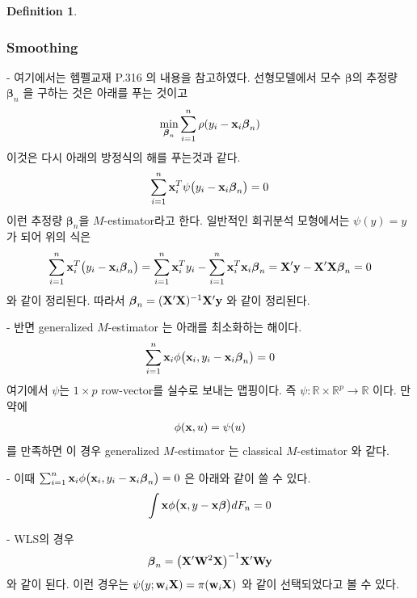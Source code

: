 \documentclass[preprint, review, 12pt]{article}
\theoremstyle{definition}
\newtheorem{dfn}{Definition}
\theoremstyle{remark}
\begin{document}
\begin{dfn}
\subsubsection*{Smoothing}

- 여기에서는 헴펠교재 P.316 의 내용을 참고하였다. 선형모델에서 모수 $\boldsymbol{\beta}$의 추정량 $\boldsymbol{\beta}_ n$ 을 구하는 것은 아래를 푸는 것이고 
\begin{align}
\min_{\boldsymbol{\beta}_ n}\sum_{i=1}^{n}\rho(y_i-{\bf x}_ i \boldsymbol{\beta}_ n)
\end{align}
이것은 다시 아래의 방정식의 해를 푸는것과 같다. 
\begin{align}
\sum_{i=1}^{n}{\bf x}_ i^T\psi\big(y_i-{\bf x}_ i \boldsymbol{\beta}_ n\big)=0 
\end{align}
이런 추정량 $\boldsymbol{\beta}_ n$을 $M$-estimator라고 한다. 일반적인 회귀분석 모형에서는 $\psi(y)=y$ 가 되어 위의 식은 
\begin{align}
\sum_{i=1}^{n}{\bf x}_ i^T\big(y_i-{\bf x}_ i \boldsymbol{\beta}_ n\big)=\sum_{i=1}^{n}{\bf x}_ i^T y_i-\sum_{i=1}^{n}{\bf x}_ i^T {\bf x}_ i \boldsymbol{\beta}_ n= {\bf X}'{\bf y}-{\bf X}'{\bf X}\boldsymbol{\beta}_ n=0 
\end{align}
와 같이 정리된다. 따라서 $\boldsymbol{\beta}_ n = ({\bf X}'{\bf X})^{-1}{\bf X}'{\bf y}$ 와 같이 정리된다.

- 반면 generalized $M$-estimator 는 아래를 최소화하는 해이다. 
\begin{align}
\sum_{i=1}^{n}{\bf x}_ i \phi\big({\bf x}_ i , y_i-{\bf x}_ i \boldsymbol{\beta}_ n\big) =0 
\end{align}
여기에서 $\psi$는 $1\times p$ row-vector를 실수로 보내는 맵핑이다. 즉 $\psi:\mathbb{R}\times \mathbb{R}^p \to \mathbb{R}$ 이다. 만약에 
\begin{align}
\phi({\bf x},u)=\psi(u)
\end{align}
를 만족하면 이 경우 generalized $M$-estimator 는 classical $M$-estimator 와 같다. 

- 이때 $\sum_{i=1}^{n}{\bf x}_ i \phi\big({\bf x}_ i , y_i-{\bf x}_ i \boldsymbol{\beta}_ n\big) =0$ 은 아래와 같이 쓸 수 있다. 
\begin{align}
\int {\bf x} \phi\big({\bf x} , y-{\bf x} \boldsymbol{\beta}\big) dF_n=0 
\end{align}

- WLS의 경우 
\begin{align}
\boldsymbol{\beta}_ n = \big({\bf X}'{\bf W}^2{\bf X}\big)^{-1}{\bf X}'{\bf W}{\bf y}
\end{align}
와 같이 된다. 이런 경우는 $\psi(y;{\bf w}_ i {\bf X})= \pi({\bf w}_ i {\bf X}) $ 와 같이 선택되었다고 볼 수 있다. 


\end{dfn}
\end{document}
